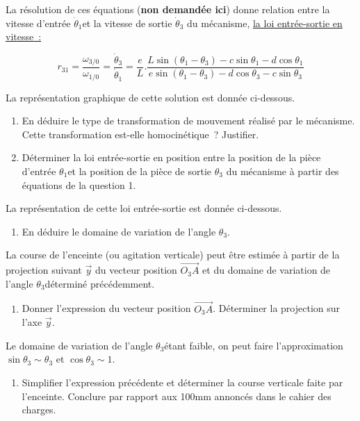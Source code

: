 La résolution de ces équations (\textbf{non demandée ici}) donne
relation entre la vitesse d'entrée \({\dot{\theta}}_{1}\)et la vitesse
de sortie \({\dot{\theta}}_{3}\) du mécanisme, \ul{la loi entrée-sortie
en vitesse~:}

\[r_{31} = \frac{\omega_{3/0}}{\omega_{1/0}} = \frac{{\dot{\theta}}_{3}}{{\dot{\theta}}_{1}} = \frac{e}{L}.\frac{L\sin(\theta_{1} - \theta_{3}) - c\sin\theta_{1} - d\cos\theta_{1}}{e\sin(\theta_{1} - \theta_{3}) - d\cos\theta_{3} - c\sin\theta_{3}}\]

La représentation graphique de cette solution est donnée ci-dessous.

\begin{enumerate}
\def\labelenumi{\arabic{enumi}.}
\item
  En déduire le type de transformation de mouvement réalisé par le
  mécanisme. Cette transformation est-elle homocinétique~? Justifier.
\item
  Déterminer la loi entrée-sortie en position entre la position de la
  pièce d'entrée \(\theta_{1}\)et la position de la pièce de sortie
  \(\theta_{3}\) du mécanisme à partir des équations de la question 1.
\end{enumerate}

La représentation de cette loi entrée-sortie est donnée ci-dessous.

\begin{enumerate}
\def\labelenumi{\arabic{enumi}.}
\setcounter{enumi}{2}
\item
  En déduire le domaine de variation de l'angle \(\theta_{3}\).
\end{enumerate}

La course de l'enceinte (ou agitation verticale) peut être estimée à
partir de la projection suivant \(\overrightarrow{y}\) du vecteur
position \(\overrightarrow{O_{3}A}\) et du domaine de variation de
l'angle \(\theta_{3}\)déterminé précédemment.

\begin{enumerate}
\def\labelenumi{\arabic{enumi}.}
\setcounter{enumi}{3}
\item
  Donner l'expression du vecteur position \(\overrightarrow{O_{3}A}\).
  Déterminer la projection sur l'axe \(\overrightarrow{y}\).
\end{enumerate}

Le domaine de variation de l'angle \(\theta_{3}\)étant faible, on peut
faire l'approximation\(\sin\theta_{3} \sim \theta_{3}\) et
\(\cos\theta_{3} \sim 1\).

\begin{enumerate}
\def\labelenumi{\arabic{enumi}.}
\setcounter{enumi}{4}
\item
  Simplifier l'expression précédente et déterminer la course verticale
  faite par l'enceinte. Conclure par rapport aux 100mm annoncés dans le
  cahier des charges.
\end{enumerate}
